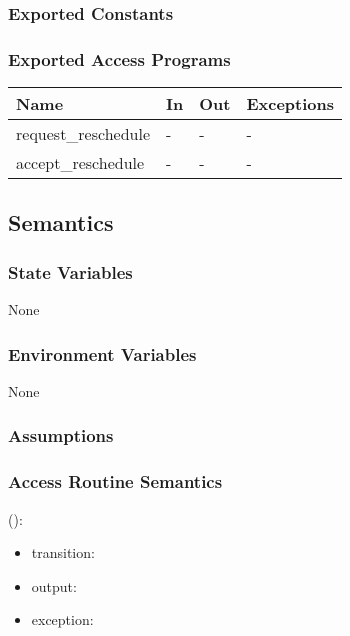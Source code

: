 \documentclass[12pt, titlepage]{article}
\begin{document}
\subsubsection{Exported Constants}

\subsubsection{Exported Access Programs}

\begin{center}
\begin{tabular}{p{5cm} p{4cm} p{4cm} p{2cm}}
\hline
\textbf{Name} & \textbf{In} & \textbf{Out} & \textbf{Exceptions} \\
\hline
request\_reschedule & - & - & - \\
accept\_reschedule & - & - & - \\
\hline
\end{tabular}
\end{center}

\subsection{Semantics}

\subsubsection{State Variables}

None

\subsubsection{Environment Variables}

None

\subsubsection{Assumptions}


\subsubsection{Access Routine Semantics}

\noindent {}():
\begin{itemize}
\item transition:  
\item output:  
\item exception:  
\end{itemize}
\end{document}
